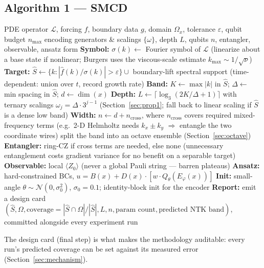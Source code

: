 \subsection{Algorithm 1 --- SMCD}
\label{sec:algorithm}

\begin{algorithm}[h]
\caption{Spectrum-Matched Circuit Design (SMCD)}
\begin{algorithmic}[1]
\Require PDE operator $\mathcal{L}$, forcing $f$, boundary data $g$, domain
  $\Omega_x$, tolerance $\varepsilon$, qubit budget $n_{\max}$
\Ensure encoding generators \& scalings $\{\omega\}$, depth $L$, qubits $n$,
  entangler, observable, ansatz form
\State \textbf{Symbol:} $\sigma(k) \gets$ Fourier symbol of $\mathcal{L}$ (linearize about a
  base state if nonlinear; Burgers uses the viscous-scale estimate $k_{\max}\sim 1/\sqrt{\nu}$)
\State \textbf{Target:} $\hat S \gets \{k : |\hat f(k)/\sigma(k)| > \varepsilon\} \cup$
  boundary-lift spectral support (time-dependent: union over $t$, record growth rate)
\State \textbf{Band:} $K \gets \max|k|$ in $\hat S$; $\Delta \gets$ min spacing in $\hat S$;
  $d \gets \dim(x)$
\State \textbf{Depth:} $L \gets \lceil \log_3(2K/\Delta + 1)\rceil$ with ternary scalings
  $\omega_j = \Delta\cdot 3^{j-1}$ (Section~\ref{sec:prop1}; fall back to linear
  scaling if $\hat S$ is a dense low band)
\State \textbf{Width:} $n \gets d + n_{\mathrm{cross}}$, where $n_{\mathrm{cross}}$ covers
  required mixed-frequency terms (e.g.\ 2-D Helmholtz needs $k_x\pm k_y$ $\Rightarrow$
  entangle the two coordinate wires)
  \State split the band into an octave ensemble (Section~\ref{sec:octave})
\EndIf
\State \textbf{Entangler:} ring-CZ if cross terms are needed, else none (unnecessary
  entanglement costs gradient variance for no benefit on a separable target)
\State \textbf{Observable:} local $\langle Z_0\rangle$ (never a global Pauli string ---
  barren plateaus)
\State \textbf{Ansatz:} hard-constrained BCs, $u = B(x) + D(x)\cdot[w\cdot Q_\theta(E_\varphi(x))]$
\State \textbf{Init:} small-angle $\theta\sim\mathcal{N}(0,\sigma_0^2)$, $\sigma_0=0.1$;
  identity-block init for the encoder
\State \textbf{Report:} emit a design card $(\hat S, \Omega, \mathrm{coverage} =
  |\hat S\cap\Omega|/|\hat S|, L, n, \text{param count}, \text{predicted NTK band})$,
  committed alongside every experiment run
\end{algorithmic}
\end{algorithm}

The design card (final step) is what makes the methodology auditable: every run's
predicted coverage can be set against its measured error (Section~\ref{sec:mechanism}).

